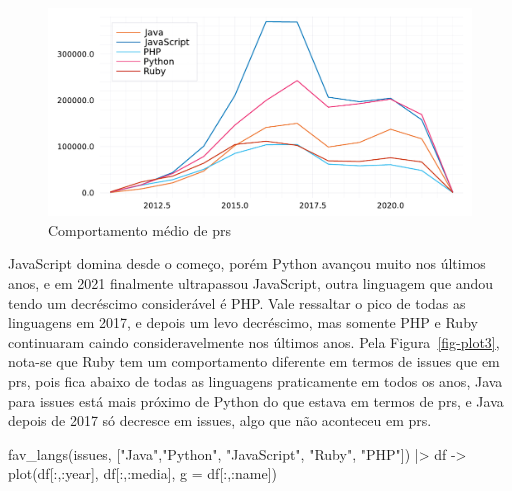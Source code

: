 \documentclass[
  letterpaper,
  DIV=11,
  numbers=noendperiod]{scrartcl}
\newenvironment{Shaded}{\begin{snugshade}}{\end{snugshade}}
\newcommand{\FunctionTok}[1]{\textcolor[rgb]{0.28,0.35,0.67}{#1}}
\newcommand{\NormalTok}[1]{\textcolor[rgb]{0.00,0.23,0.31}{#1}}
\newcommand{\OperatorTok}[1]{\textcolor[rgb]{0.37,0.37,0.37}{#1}}
\newcommand{\StringTok}[1]{\textcolor[rgb]{0.13,0.47,0.30}{#1}}
\begin{document}
\begin{figure}[H]

{\centering \includegraphics{report_files/figure-pdf/fig-plot2-output-1.pdf}

}

\caption{\label{fig-plot2}Comportamento médio de prs}

\end{figure}

JavaScript domina desde o começo, porém Python avançou muito nos últimos
anos, e em 2021 finalmente ultrapassou JavaScript, outra linguagem que
andou tendo um decréscimo considerável é PHP. Vale ressaltar o pico de
todas as linguagens em 2017, e depois um levo decréscimo, mas somente
PHP e Ruby continuaram caindo consideravelmente nos últimos anos. Pela
Figura~\ref{fig-plot3}, nota-se que Ruby tem um comportamento diferente
em termos de issues que em prs, pois fica abaixo de todas as linguagens
praticamente em todos os anos, Java para issues está mais próximo de
Python do que estava em termos de prs, e Java depois de 2017 só decresce
em issues, algo que não aconteceu em prs.

\begin{Shaded}
\begin{Highlighting}[]
\FunctionTok{fav\_langs}\NormalTok{(issues, [}\StringTok{"Java"}\NormalTok{,}\StringTok{"Python"}\NormalTok{, }\StringTok{"JavaScript"}\NormalTok{, }\StringTok{"Ruby"}\NormalTok{, }\StringTok{"PHP"}\NormalTok{]) }\OperatorTok{|\textgreater{}} 
\NormalTok{      df }\OperatorTok{{-}\textgreater{}} \FunctionTok{plot}\NormalTok{(df[}\OperatorTok{:}\NormalTok{,}\OperatorTok{:}\NormalTok{year], df[}\OperatorTok{:}\NormalTok{,}\OperatorTok{:}\NormalTok{media], g }\OperatorTok{=}\NormalTok{ df[}\OperatorTok{:}\NormalTok{,}\OperatorTok{:}\NormalTok{name])}
\end{Highlighting}
\end{Shaded}
\end{document}
